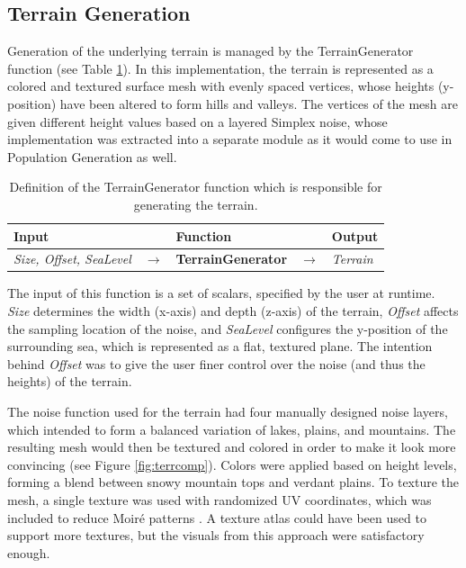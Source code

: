 \subsection{Terrain Generation}

Generation of the underlying terrain is managed by the TerrainGenerator function (see Table \ref{table:terrgen}).
In this implementation, the terrain is represented as a colored and textured surface mesh with evenly spaced vertices, whose heights (y-position) have been altered to form hills and valleys.
The vertices of the mesh are given different height values based on a layered Simplex noise, whose implementation was extracted into a separate module as it would come to use in Population Generation as well.

\begin{table}[H]
  \centering
  \begin{tabular}{lllll}
    \textbf{Input} & & \textbf{Function} & & \textbf{Output} \\
    \midrule
    \textit{Size, Offset, SeaLevel} & $\rightarrow$ & \textbf{TerrainGenerator} & $\rightarrow$ & \textit{Terrain} \\
    \bottomrule
  \end{tabular}

  \caption{Definition of the TerrainGenerator function which is responsible for generating the terrain.}
  \label{table:terrgen}
\end{table}
\vspace{-0.4cm} %

The input of this function is a set of scalars, specified by the user at runtime.
\textit{Size} determines the width (x-axis) and depth (z-axis) of the terrain,
\textit{Offset} affects the sampling location of the noise, and \textit{SeaLevel} configures the y-position of the surrounding sea, which is represented as a flat, textured plane.
The intention behind \textit{Offset} was to give the user finer control over the noise (and thus the heights) of the terrain.

The noise function used for the terrain had four manually designed noise layers, which intended to form a balanced variation of lakes, plains, and mountains.
The resulting mesh would then be textured and colored in order to make it look more convincing (see Figure \ref{fig:terrcomp}).
Colors were applied based on height levels, forming a blend between snowy mountain tops and verdant plains.
To texture the mesh, a single texture was used with randomized UV coordinates, which was included to reduce Moiré patterns \cite{moire_pattern}.
A texture atlas could have been used to support more textures, but the visuals from this approach were satisfactory enough.

